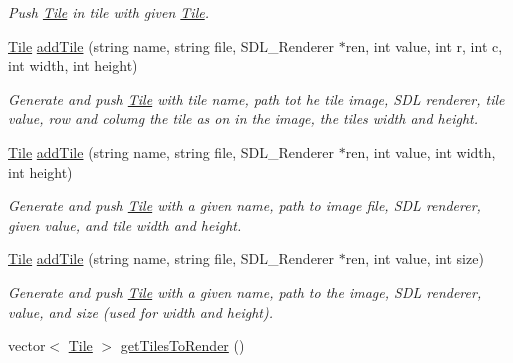 \begin{DoxyCompactItemize}
\begin{DoxyCompactList}\small\item\em Push \hyperlink{classTile}{Tile} in tile with given \hyperlink{classTile}{Tile}. \end{DoxyCompactList}\item 
\hyperlink{classTile}{Tile} \hyperlink{classTileset_aea4085286f450afdb53b22c917a77cba}{add\+Tile} (string name, string file, S\+D\+L\+\_\+\+Renderer $\ast$ren, int value, int r, int c, int width, int height)\hypertarget{classTileset_aea4085286f450afdb53b22c917a77cba}{}\label{classTileset_aea4085286f450afdb53b22c917a77cba}

\begin{DoxyCompactList}\small\item\em Generate and push \hyperlink{classTile}{Tile} with tile name, path tot he tile image, S\+DL renderer, tile value, row and columg the tile as on in the image, the tiles width and height. \end{DoxyCompactList}\item 
\hyperlink{classTile}{Tile} \hyperlink{classTileset_af8022d2b4129de86c132172ac8ce23a5}{add\+Tile} (string name, string file, S\+D\+L\+\_\+\+Renderer $\ast$ren, int value, int width, int height)\hypertarget{classTileset_af8022d2b4129de86c132172ac8ce23a5}{}\label{classTileset_af8022d2b4129de86c132172ac8ce23a5}

\begin{DoxyCompactList}\small\item\em Generate and push \hyperlink{classTile}{Tile} with a given name, path to image file, S\+DL renderer, given value, and tile width and height. \end{DoxyCompactList}\item 
\hyperlink{classTile}{Tile} \hyperlink{classTileset_adc54ffeda362f79668abb0bad2f73296}{add\+Tile} (string name, string file, S\+D\+L\+\_\+\+Renderer $\ast$ren, int value, int size)\hypertarget{classTileset_adc54ffeda362f79668abb0bad2f73296}{}\label{classTileset_adc54ffeda362f79668abb0bad2f73296}

\begin{DoxyCompactList}\small\item\em Generate and push \hyperlink{classTile}{Tile} with a given name, path to the image, S\+DL renderer, value, and size (used for width and height). \end{DoxyCompactList}\item 
vector$<$ \hyperlink{classTile}{Tile} $>$ \hyperlink{classTileset_a25d1e2559b0d260fa64ce21f02622920}{get\+Tiles\+To\+Render} ()\hypertarget{classTileset_a25d1e2559b0d260fa64ce21f02622920}{}\label{classTileset_a25d1e2559b0d260fa64ce21f02622920}


\end{DoxyCompactItemize}
